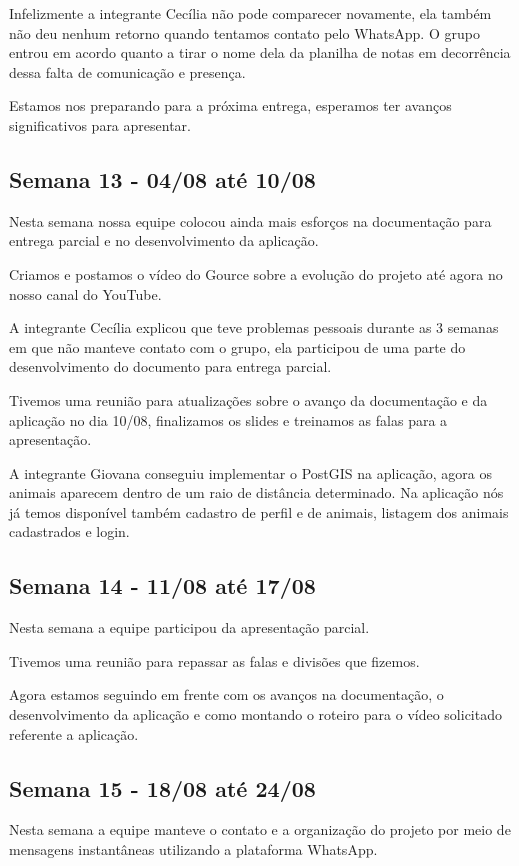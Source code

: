 \begin{apendicesenv}
\begin{flushleft}
Infelizmente a integrante Cecília não pode comparecer novamente, ela também não deu nenhum retorno quando tentamos contato pelo \gls{WhatsApp}. O grupo entrou em acordo quanto a tirar o nome dela da planilha de notas em decorrência dessa falta de comunicação e presença.

Estamos nos preparando para a próxima entrega, esperamos ter avanços significativos para apresentar.
\end{flushleft}
\begin{flushleft}
 \section{Semana 13 - 04/08 até 10/08}
 Nesta semana nossa equipe colocou ainda mais esforços na documentação para entrega parcial e no desenvolvimento da aplicação.

Criamos e postamos o vídeo do \gls{Gource} sobre a evolução do projeto até agora no nosso canal do \gls{YouTube}.

A integrante Cecília explicou que teve problemas pessoais durante as 3 semanas em que não manteve contato com o grupo, ela participou de uma parte do desenvolvimento do documento para entrega parcial.

Tivemos uma reunião para atualizações sobre o avanço da documentação e da aplicação no dia 10/08, finalizamos os slides e treinamos as falas para a apresentação.

A integrante Giovana conseguiu implementar o \gls{PostGIS} na aplicação, agora os animais aparecem dentro de um raio de distância determinado. Na aplicação nós já temos disponível também cadastro de perfil e de animais, listagem dos animais cadastrados e login.
\end{flushleft}
\begin{flushleft}
 \section{Semana 14 - 11/08 até 17/08}
 Nesta semana a equipe participou da apresentação parcial.

Tivemos uma reunião para repassar as falas e divisões que fizemos.

Agora estamos seguindo em frente com os avanços na documentação, o desenvolvimento da aplicação e como montando o roteiro para o vídeo solicitado referente a aplicação.
\end{flushleft}
\begin{flushleft}
 \section{Semana 15 - 18/08 até 24/08}
  Nesta semana a equipe manteve o contato e a organização do projeto por meio de mensagens instantâneas utilizando a plataforma \gls{WhatsApp}.


\end{flushleft}
\end{apendicesenv}
